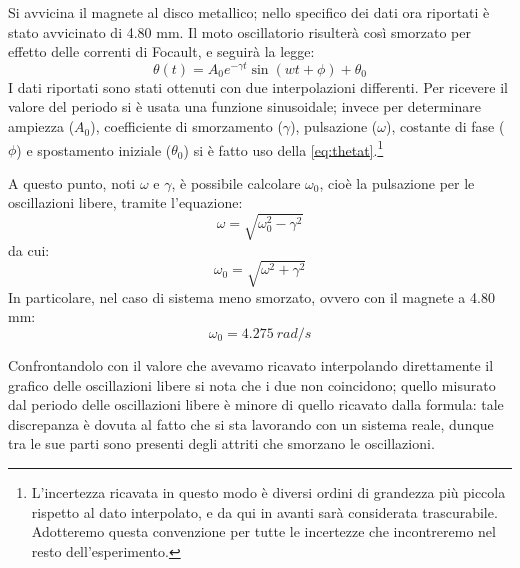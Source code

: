Si avvicina il magnete al disco metallico; nello specifico dei dati ora riportati è stato avvicinato di 4.80 mm. Il moto oscillatorio risulterà così smorzato per effetto delle correnti di Focault, e seguirà la legge:
\begin{equation}\label{eq:thetat}
\theta (t) = A_0 e^{- \gamma t} \sin(wt+\phi)+\theta_0
\end{equation}
I dati riportati sono stati ottenuti con due interpolazioni differenti. Per ricevere il valore del periodo si è usata una funzione sinusoidale; invece per determinare ampiezza ($A_0$), coefficiente di smorzamento ($\gamma$), pulsazione ($\omega$), costante di fase ($\phi$) e spostamento iniziale ($\theta_0$) si è fatto uso della \ref{eq:thetat}.\footnote{L'incertezza ricavata in questo modo è diversi ordini di grandezza più piccola rispetto al dato interpolato, e da qui in avanti sarà considerata trascurabile. Adotteremo questa convenzione per tutte le incertezze che incontreremo nel resto dell'esperimento.}

A questo punto, noti $\omega$ e $\gamma$, è possibile calcolare $ \omega_0 $, cioè la pulsazione per le oscillazioni libere, tramite l'equazione:
\begin{equation}
\omega = \sqrt{\omega_0^2 - \gamma^2}
\end{equation}
da cui:
\begin{equation}\label{eq:omega}
\omega_0 = \sqrt{\omega^2 + \gamma^2}
\end{equation}
In particolare, nel caso di sistema meno smorzato, ovvero con il magnete a 4.80 mm:
$$\omega_0=4.275\ rad/s$$

Confrontandolo con il valore che avevamo ricavato interpolando direttamente il grafico delle oscillazioni libere si nota che i due non coincidono; quello misurato dal periodo delle oscillazioni libere è minore di quello ricavato dalla formula: tale discrepanza è dovuta al fatto che si sta lavorando con un sistema reale, dunque tra le sue parti sono presenti degli attriti che smorzano le oscillazioni.

